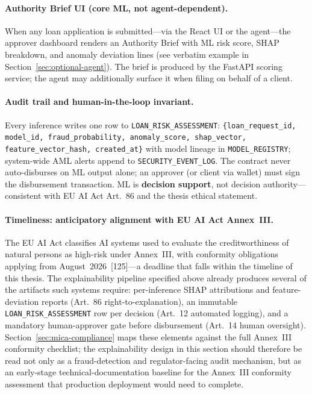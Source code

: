 \documentclass[12pt,a4paper]{report}
\begin{document}
\paragraph{Authority Brief UI (core ML, not agent-dependent).}
When any loan application is submitted---via the React UI or the agent---the approver dashboard renders an Authority Brief with ML risk score, SHAP breakdown, and anomaly deviation lines (see verbatim example in Section~\ref{sec:optional-agent}). The brief is produced by the FastAPI scoring service; the agent may additionally surface it when filing on behalf of a client.

\paragraph{Audit trail and human-in-the-loop invariant.}
Every inference writes one row to \texttt{LOAN\_RISK\_ASSESSMENT}: \texttt{\{loan\_request\_id, model\_id, fraud\_probability, anomaly\_score, shap\_vector, feature\_vector\_hash, created\_at\}} with model lineage in \texttt{MODEL\_REGISTRY}; system-wide AML alerts append to \texttt{SECURITY\_EVENT\_LOG}. The contract never auto-disburses on ML output alone; an approver (or client via wallet) must sign the disbursement transaction. ML is \textbf{decision support}, not decision authority---consistent with EU AI Act Art.~86 and the thesis ethical statement.

\paragraph{Timeliness: anticipatory alignment with EU AI Act Annex~III.}
The EU AI Act classifies AI systems used to evaluate the creditworthiness
of natural persons as high-risk under Annex~III, with conformity
obligations applying from August~2026~[125]---a deadline that falls
within the timeline of this thesis. The explainability pipeline specified
above already produces several of the artifacts such systems require:
per-inference SHAP attributions and feature-deviation reports (Art.~86
right-to-explanation), an immutable \texttt{LOAN\_RISK\_ASSESSMENT} row per
decision (Art.~12 automated logging), and a mandatory human-approver gate
before disbursement (Art.~14 human oversight). Section~\ref{sec:mica-compliance}
maps these elements against the full Annex~III conformity checklist; the
explainability design in this section should therefore be read not only
as a fraud-detection and regulator-facing audit mechanism, but as an
early-stage technical-documentation baseline for the Annex~III conformity
assessment that production deployment would need to complete.
\end{document}
